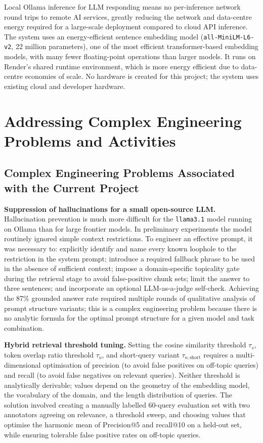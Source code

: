 \documentclass[12pt,a4paper]{report}
\begin{document}
Local Ollama inference for LLM responding means no per-inference network round trips to remote AI services, greatly reducing the network and data-centre energy required for a large-scale deployment compared to cloud API inference. The system uses an energy-efficient sentence embedding model (\texttt{all-MiniLM-L6-v2}, 22 million parameters), one of the most efficient transformer-based embedding models, with many fewer floating-point operations than larger models. It runs on Render's shared runtime environment, which is more energy efficient due to data-centre economies of scale. No hardware is created for this project; the system uses existing cloud and developer hardware.

\chapter{Addressing Complex Engineering Problems and Activities}

\section{Complex Engineering Problems Associated with the Current Project}

\textbf{Suppression of hallucinations for a small open-source LLM.} Hallucination prevention is much more difficult for the \texttt{llama3.1} model running on Ollama than for large frontier models. In preliminary experiments the model routinely ignored simple context restrictions. To engineer an effective prompt, it was necessary to: explicitly identify and name every known loophole to the restriction in the system prompt; introduce a required fallback phrase to be used in the absence of sufficient context; impose a domain-specific topicality gate during the retrieval stage to avoid false-positive chunk sets; limit the answer to three sentences; and incorporate an optional LLM-as-a-judge self-check. Achieving the 87\% grounded answer rate required multiple rounds of qualitative analysis of prompt structure variants; this is a complex engineering problem because there is no analytic formula for the optimal prompt structure for a given model and task combination.

\textbf{Hybrid retrieval threshold tuning.} Setting the cosine similarity threshold $\tau_s$, token overlap ratio threshold $\tau_o$, and short-query variant $\tau_{o,\text{short}}$ requires a multi-dimensional optimisation of precision (to avoid false positives on off-topic queries) and recall (to avoid false negatives on relevant queries). Neither threshold is analytically derivable; values depend on the geometry of the embedding model, the vocabulary of the domain, and the length distribution of queries. The solution involved creating a manually labelled 60-query evaluation set with two annotators agreeing on relevance, a threshold sweep, and choosing values that optimise the harmonic mean of Precision@5 and recall@10 on a held-out set, while ensuring tolerable false positive rates on off-topic queries.
\end{document}
